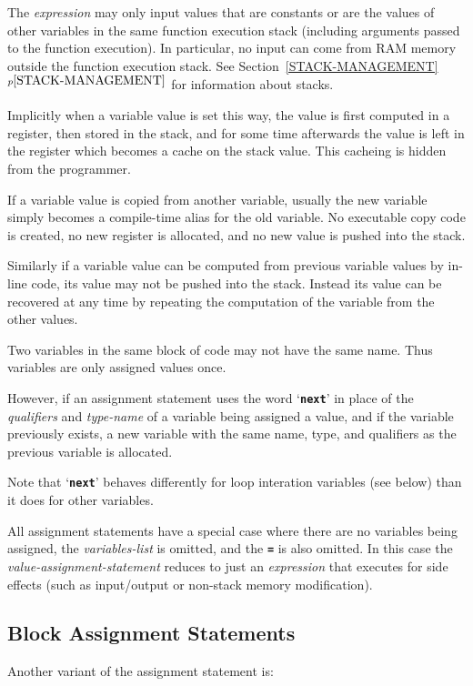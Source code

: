 \documentclass[12pt]{article}
\newcommand{\TT}[1]{{\tt \bfseries #1}}
\newcommand{\itemref}[1]{\ref{#1}$^{p\pageref{#1}}$}
\begin{document}
The {\em expression} may only input values that are constants or are
the values of other variables in the same function execution
stack (including
arguments passed to the function execution).  In particular,
no input can come from RAM memory outside the function execution stack.
See Section~\itemref{STACK-MANAGEMENT} for information about stacks.

Implicitly when a variable value is set this way, the value is first
computed in a register, then stored in the stack, and for some time
afterwards the value is left in the register which becomes a cache
on the stack value.  This cacheing is hidden from the programmer.

If a variable value is copied from another variable, usually the
new variable simply becomes a compile-time alias for the old variable.
No executable copy code is created, no new register is allocated, and no new
value is pushed into the stack.

Similarly if a variable value can be computed from previous variable
values by in-line code, 
its value may not be pushed into the stack.  Instead its
value can be recovered at any time by repeating the computation
of the variable from the other values.

Two variables in the same block of code may not have the same
name.  Thus variables are only assigned values once.

However, if an assignment statement uses the word `\TT{next}' in
place of the {\em qualifiers} and {\em type-name}
of a variable being assigned a value, and
if the variable previously exists, a new variable with the same
name, type, and qualifiers as the previous variable is allocated.

Note that `\TT{next}' behaves differently for loop interation
variables (see below) than it does for other variables.

All assignment statements have a special case where there are
no variables being assigned, the {\em variables-list} is omitted,
and the \TT{=} is also omitted.  In this case the
{\em value-assignment-statement} reduces to just an {\em expression}
that executes for side effects (such as
input/output or non-stack memory modification).

\subsection{Block Assignment Statements}
\label{BlOCK-ASSIGNMENT-STATEMENTS}

Another variant of the assignment statement is:
\end{document}
